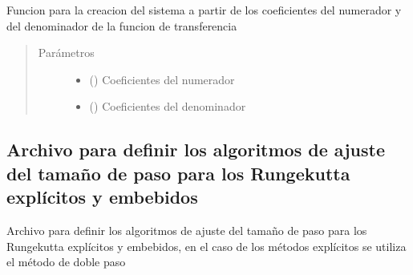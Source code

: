 \documentclass[letterpaper,10pt,spanish]{sphinxmanual}
\begin{document}
\begin{fulllineitems}
\label{\detokenize{codigos/rutinas_simulacion:rutinas_simulacion.system_creator_tf}}
Funcion para la creacion del sistema a partir de los coeficientes del numerador y del denominador de la funcion de transferencia
\begin{quote}\begin{description}
\item[{Parámetros}] \leavevmode\begin{itemize}
\item {} 
 () \textendash{} Coeficientes del numerador

\item {} 
 () \textendash{} Coeficientes del denominador

\end{itemize}

\end{description}\end{quote}

\end{fulllineitems}



\subsection{Archivo para definir los algoritmos de ajuste del tamaño de paso para los Runge\sphinxhyphen{}kutta explícitos y embebidos}
\label{\detokenize{codigos/rutinas_rk:archivo-para-definir-los-algoritmos-de-ajuste-del-tamano-de-paso-para-los-runge-kutta-explicitos-y-embebidos}}\label{\detokenize{codigos/rutinas_rk::doc}}\label{\detokenize{codigos/rutinas_rk:module-rutinas_rk}}
Archivo para definir los algoritmos de ajuste del tamaño de paso para los Runge\sphinxhyphen{}kutta explícitos y embebidos, en el caso de los métodos explícitos se utiliza el método de doble paso
\end{document}
